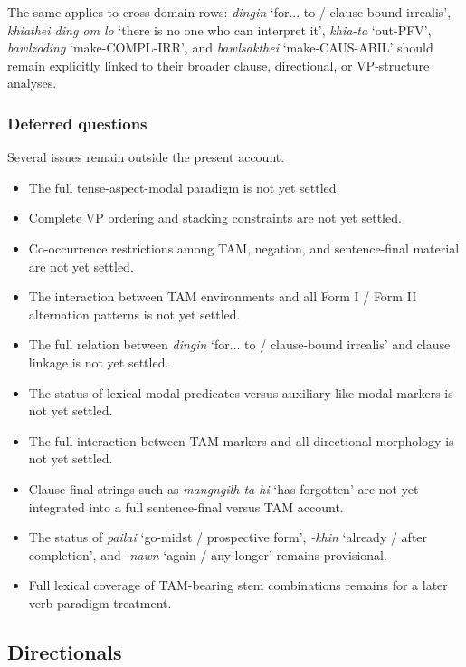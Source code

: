 \documentclass[
  11pt,
  a4paper,
]{article}
\providecommand{\tightlist}{%
  \setlength{\itemsep}{0pt}\setlength{\parskip}{0pt}}
\newcommand{\tdim}[1]{\textit{#1}}
\newcommand{\glossquote}[1]{`#1'}
\begin{document}
The same applies to cross-domain rows: \tdim{dingin}
\glossquote{for... to / clause-bound irrealis},
\tdim{khiathei ding om lo}
\glossquote{there is no one who can interpret it}, \tdim{khia-ta}
\glossquote{out-PFV}, \tdim{bawlzoding} \glossquote{make-COMPL-IRR}, and
\tdim{bawlsakthei} \glossquote{make-CAUS-ABIL} should remain explicitly
linked to their broader clause, directional, or VP-structure analyses.

\subsubsection{Deferred questions}\label{deferred-questions-2}

Several issues remain outside the present account.

\begin{itemize}
\tightlist
\item
  The full tense-aspect-modal paradigm is not yet settled.
\item
  Complete VP ordering and stacking constraints are not yet settled.
\item
  Co-occurrence restrictions among TAM, negation, and sentence-final
  material are not yet settled.
\item
  The interaction between TAM environments and all Form I / Form II
  alternation patterns is not yet settled.
\item
  The full relation between \tdim{dingin}
  \glossquote{for... to / clause-bound irrealis} and clause linkage is
  not yet settled.
\item
  The status of lexical modal predicates versus auxiliary-like modal
  markers is not yet settled.
\item
  The full interaction between TAM markers and all directional
  morphology is not yet settled.
\item
  Clause-final strings such as \tdim{mangngilh ta hi}
  \glossquote{has forgotten} are not yet integrated into a full
  sentence-final versus TAM account.
\item
  The status of \tdim{pailai} \glossquote{go-midst / prospective form},
  \tdim{-khin} \glossquote{already / after completion}, and \tdim{-nawn}
  \glossquote{again / any longer} remains provisional.
\item
  Full lexical coverage of TAM-bearing stem combinations remains for a
  later verb-paradigm treatment.
\end{itemize}

\subsection{Directionals}\label{directionals}
\end{document}
